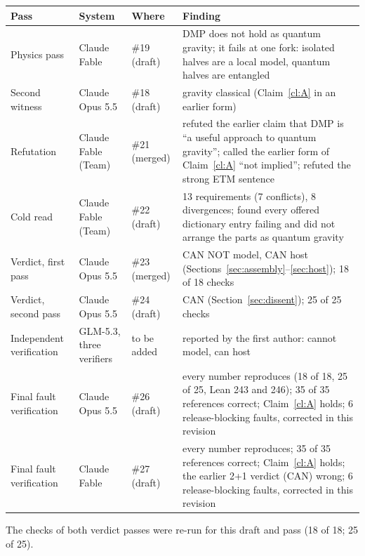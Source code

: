 \documentclass[11pt,a4paper]{article}
\theoremstyle{definition}
\theoremstyle{remark}
\begin{document}
\begin{center}\small
\begin{tabularx}{\linewidth}{@{}lllL@{}}
\toprule
Pass & System & Where & Finding \\
\midrule
Physics pass & Claude Fable & \#19 (draft) & DMP does not hold as quantum gravity; it fails at one fork: isolated halves are a local model,
quantum halves are entangled \\
Second witness & Claude Opus 5.5 & \#18 (draft) & gravity classical (Claim~\ref{cl:A} in an earlier form) \\
Refutation & Claude Fable (Team) & \#21 (merged) & refuted the earlier claim that DMP is ``a useful approach to quantum gravity'';
called the earlier form of Claim~\ref{cl:A} ``not implied''; refuted the strong ETM sentence \\
Cold read & Claude Fable (Team) & \#22 (draft) & 13 requirements (7 conflicts), 8 divergences; found every offered dictionary entry
failing and did not arrange the parts as quantum gravity \\
Verdict, first pass & Claude Opus 5.5 & \#23 (merged) & CAN NOT model, CAN host (Sections~\ref{sec:assembly}--\ref{sec:host}); 18 of
18 checks \\
Verdict, second pass & Claude Opus 5.5 & \#24 (draft) & CAN (Section~\ref{sec:dissent}); 25 of 25 checks \\
Independent verification & GLM-5.3, three verifiers & to be added & reported by the first author: cannot model, can host \\
Final fault verification & Claude Opus 5.5 & \#26 (draft) & every number reproduces (18 of 18, 25 of 25, Lean 243 and 246); 35 of 35
references correct; Claim~\ref{cl:A} holds; 6 release-blocking faults, corrected in this revision \\
Final fault verification & Claude Fable & \#27 (draft) & every number reproduces; 35 of 35 references correct; Claim~\ref{cl:A} holds;
the earlier 2+1 verdict (CAN) wrong; 6 release-blocking faults, corrected in this revision \\
\bottomrule
\end{tabularx}
\end{center}

\noindent The checks of both verdict passes were re-run for this draft and pass (18 of 18; 25 of 25).
\end{document}

